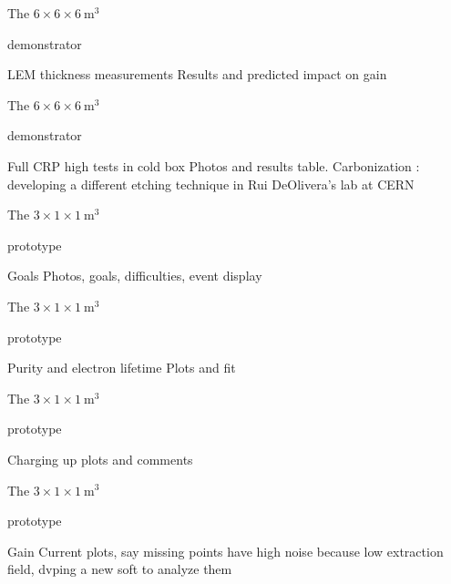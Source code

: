 \documentclass[10pt]{beamer}
\begin{document}
    \begin{frame}{The \texorpdfstring{$6 \times 6 \times \SI{6}{\meter\cubed}$}{666}
    		\begin{scriptsize}
    		\end{scriptsize} demonstrator}{LEM thickness measurements}
    	Results and predicted impact on gain
    \end{frame}
    
    \begin{frame}{The \texorpdfstring{$6 \times 6 \times \SI{6}{\meter\cubed}$}{666}
    		\begin{scriptsize}
    		\end{scriptsize} demonstrator}{Full CRP high tests in cold box}
    	Photos and results table. Carbonization : developing a different etching technique in Rui DeOlivera's lab at CERN
    \end{frame}
    
    \begin{frame}{The \texorpdfstring{$3 \times 1 \times \SI{1}{\meter\cubed}$}{311}
    		\begin{scriptsize}
    		\end{scriptsize} prototype}{Goals}
    	Photos, goals, difficulties, event display
    \end{frame}
    
    \begin{frame}{The \texorpdfstring{$3 \times 1 \times \SI{1}{\meter\cubed}$}{311}
    		\begin{scriptsize}
    		\end{scriptsize} prototype}{Purity and electron lifetime}
    	Plots and fit
    \end{frame}
    
    \begin{frame}{The \texorpdfstring{$3 \times 1 \times \SI{1}{\meter\cubed}$}{311}
    		\begin{scriptsize}
    		\end{scriptsize} prototype}{Charging up}
    	plots and comments
    \end{frame}
    
    \begin{frame}{The \texorpdfstring{$3 \times 1 \times \SI{1}{\meter\cubed}$}{311}
    		\begin{scriptsize}
    		\end{scriptsize} prototype}{Gain}
    	Current plots, say missing points have high noise because low extraction field, dvping a new soft to analyze them
    \end{frame}
    
\end{document}
